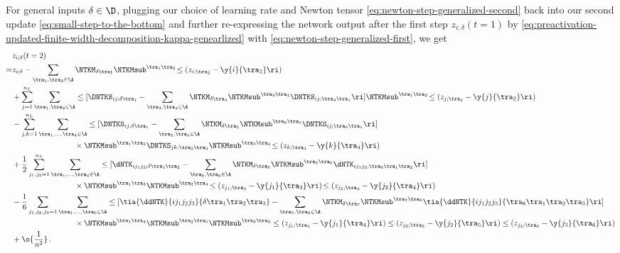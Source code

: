 For general inputs $\delta\in\D$, plugging our choice of learning rate and Newton tensor \eqref{eq:newton-step-generalized-second} back into our second update \eqref{eq:small-step-to-the-bottom} and further re-expressing the network output after the first step $z_{i;\delta}(t=1)$ by \eqref{eq:preactivation-updated-finite-width-decomposition-kappa-genearlized} with \eqref{eq:newton-step-generalized-first}, we get
\begin{align}\label{eq:finite-width-network-output-general-data}
&z_{i;\delta}(t=2)\, \\
=&z_{i;\delta}-\sum_{\tra_1,\tra_2\in\A}\NTKM_{\delta\tra_1}\NTKMsub^{\tra_1\tra_2}\!\le(z_{i;\tra_2}-\y{i}{\tra_2}\ri)\, \notag \\
&+\sum_{j=1}^{n_{L}}\sum_{\tra_1,\tra_2\in\A}\le[\DNTKS_{ij;\delta\tra_1}-\sum_{\tra_3,\tra_4\in\A}\NTKM_{\delta\tra_3}\NTKMsub^{\tra_3\tra_4}\DNTKS_{ij;\tra_4\tra_1}\ri]\NTKMsub^{\tra_1\tra_2}\!\le(z_{j;\tra_2}-\y{j}{\tra_2}\ri)\, \notag\\
&-\sum_{j,k=1}^{n_{L}}\sum_{\tra_1,\ldots,\tra_4\in\A}\le[\DNTKS_{ij;\delta\tra_1}-\sum_{\tra_5,\tra_6\in\A}\NTKM_{\delta\tra_5}\NTKMsub^{\tra_5\tra_6}\DNTKS_{ij;\tra_6\tra_1}\ri]\, \notag\\
&\quad\quad\quad\quad\quad\quad\quad\quad\times\NTKMsub^{\tra_1\tra_2}\DNTKS_{jk;\tra_2\tra_3}\NTKMsub^{\tra_3\tra_4}\!\le(z_{k;\tra_4}-\y{k}{\tra_4}\ri)\, \notag\\
&+\frac{1}{2}\sum_{j_1,j_2=1}^{n_{L}}\sum_{\tra_1,\ldots,\tra_4\in\A}\le[\dNTK_{i j_1j_2;\delta\tra_1\tra_2}-\sum_{\tra_5,\tra_6\in\A}\NTKM_{\delta\tra_5}\NTKMsub^{\tra_5\tra_6}\dNTK_{i j_1j_2;\tra_6\tra_1\tra_2}\ri]\, \notag\\
&\quad\quad\quad\quad\quad\quad\quad\quad\times\NTKMsub^{\tra_1\tra_3}\NTKMsub^{\tra_2\tra_4} \!\le(z_{j_1;\tra_3}-\y{j_1}{\tra_3}\ri)\!\le(z_{j_2;\tra_4}-\y{j_2}{\tra_4}\ri) \, \notag \\ 
&-\frac{1}{6}\sum_{j_1,j_2,j_3 =1 }\sum_{\tra_1,\ldots,\tra_6\in\A}\le[\tia{\ddNTK}{i j_1j_2j_3}{\delta\tra_1\tra_2\tra_3}
- \sum_{\tra_7, \tra_8 \in \A}\NTKM_{\delta\tra_7}\NTKMsub^{\tra_7\tra_8}\tia{\ddNTK}{i j_1j_2j_3}{\tra_8\tra_1\tra_2\tra_3} \ri]  
 \, \notag \\
&\quad\quad\quad\quad\quad\quad\quad\quad\times \NTKMsub^{\tra_1\tra_4}\NTKMsub^{\tra_2\tra_5}\NTKMsub^{\tra_3\tra_6} \le(z_{j_1;\tra_4}-\y{j_1}{\tra_4}\ri)\le(z_{j_2;\tra_5}-\y{j_2}{\tra_5}\ri)\le(z_{j_3;\tra_6}-\y{j_3}{\tra_6}\ri) \, \notag \\
&+\o{\frac{1}{n^2}}\, .\notag
\end{align}
